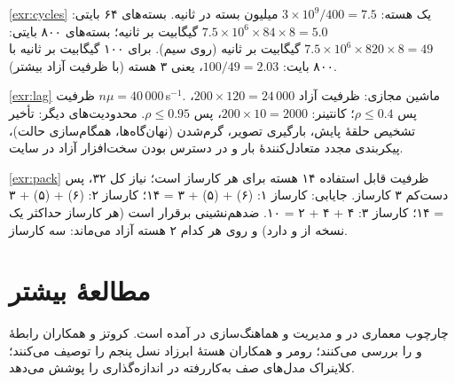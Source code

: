 \documentclass[11pt,a4paper]{article}
\begin{document}
\begin{solutionbox}{\ref{exr:cycles}}
یک هسته: $3\times10^9/400 = 7.5$ میلیون بسته در ثانیه. بسته‌های ۶۴ بایتی: $7.5\times10^6\times84\times8 = 5.0$ گیگابیت بر
ثانیه؛ بسته‌های ۸۰۰ بایتی: $7.5\times10^6\times820\times8 = 49$ گیگابیت بر ثانیه (روی سیم). برای ۱۰۰ گیگابیت بر ثانیه با ۸۰۰
بایت: $100/49 = 2.03$، یعنی ۳ هسته (با ظرفیت آزاد بیشتر).
\end{solutionbox}

\begin{solutionbox}{\ref{exr:lag}}
ظرفیت $n\mu = 40\,000$\,s$^{-1}$. ماشین مجازی: ظرفیت آزاد $200\times120 = 24\,000$، پس $\rho \le 0.4$؛ کانتینر:
$200\times10 = 2000$، پس $\rho \le 0.95$. محدودیت‌های دیگر: تأخیر تشخیص حلقهٔ پایش، بارگیری تصویر، گرم‌شدن (نهان‌گاه‌ها،
همگام‌سازی حالت)، پیکربندی مجدد متعادل‌کنندهٔ بار و در دسترس بودن سخت‌افزار آزاد در سایت.
\end{solutionbox}

\begin{solutionbox}{\ref{exr:pack}}
ظرفیت قابل استفاده ۱۴ هسته برای هر کارساز است؛ نیاز کل ۳۲، پس دست‌کم ۳ کارساز. جایابی: کارساز ۱:  (۶) +  (۵) +
۳ = ۱۴؛ کارساز ۲:  (۶) +  (۵) + ۳ = ۱۴؛ کارساز ۳: ۴ + ۴ + ۲ = ۱۰. ضدهم‌نشینی برقرار است (هر کارساز حداکثر یک نسخه از
 و  دارد) و روی هر کدام ۲ هسته آزاد می‌ماند: سه کارساز.
\end{solutionbox}

\section{مطالعهٔ بیشتر}
چارچوب معماری  در  \cite{etsinfv002} و مدیریت و هماهنگ‌سازی در 
\cite{etsinfvman001} آمده است. کروتز و همکاران \cite{kreutz2015sdn} رابطهٔ  و  را بررسی می‌کنند؛ رومر و
همکاران \cite{rommer2020core} هستهٔ ابرزاد نسل پنجم را توصیف می‌کنند؛ کلاینراک \cite{kleinrock1975queueing} مدل‌های صف به‌کاررفته
در اندازه‌گذاری را پوشش می‌دهد.

\begin{latin}
\printbibliography[heading=subbibliography,title={References}]
\end{latin}
\end{document}
